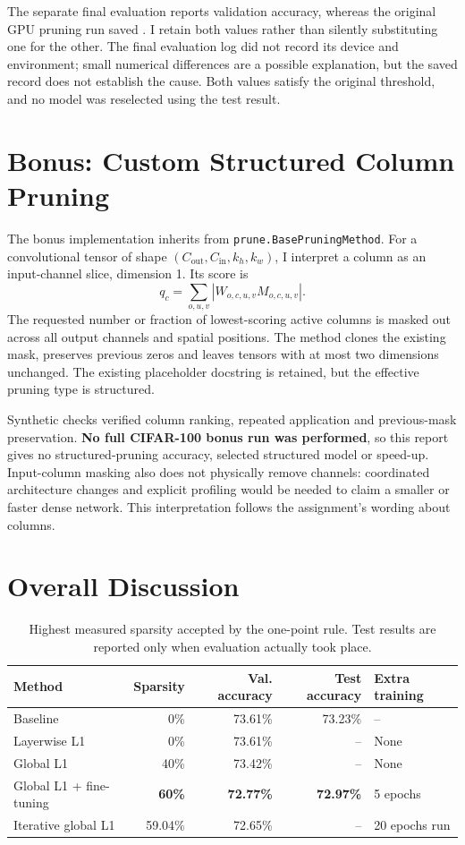 \documentclass[11pt,a4paper]{article}
\newcommand{\code}[1]{\texttt{#1}}
\begin{document}
The separate final evaluation reports \SelectedEvalVal{} validation accuracy, whereas the original GPU pruning run saved \SelectedVal. I retain both values rather than silently substituting one for the other. The final evaluation log did not record its device and environment; small numerical differences are a possible explanation, but the saved record does not establish the cause. Both values satisfy the original threshold, and no model was reselected using the test result.

\section{Bonus: Custom Structured Column Pruning}

The bonus implementation inherits from \code{prune.BasePruningMethod}. For a convolutional tensor of shape $(C_{\mathrm{out}},C_{\mathrm{in}},k_h,k_w)$, I interpret a column as an input-channel slice, dimension 1. Its score is
\begin{equation}
 q_c=\sum_{o,u,v}|W_{o,c,u,v}M_{o,c,u,v}|.
\end{equation}
The requested number or fraction of lowest-scoring active columns is masked out across all output channels and spatial positions. The method clones the existing mask, preserves previous zeros and leaves tensors with at most two dimensions unchanged. The existing placeholder docstring is retained, but the effective pruning type is structured.

Synthetic checks verified column ranking, repeated application and previous-mask preservation. \textbf{No full CIFAR-100 bonus run was performed}, so this report gives no structured-pruning accuracy, selected structured model or speed-up. Input-column masking also does not physically remove channels: coordinated architecture changes and explicit profiling would be needed to claim a smaller or faster dense network. This interpretation follows the assignment's wording about columns.

\section{Overall Discussion}

\begin{table}[htbp]
\centering
\small
\caption{Highest measured sparsity accepted by the one-point rule. Test results are reported only when evaluation actually took place.}
\label{tab:summary}
\begin{tabular}{lrrrl}
\toprule
Method & Sparsity & Val. accuracy & Test accuracy & Extra training \\
\midrule
Baseline & 0\% & 73.61\% & 73.23\% & -- \\
Layerwise L1 & 0\% & 73.61\% & -- & None \\
Global L1 & 40\% & 73.42\% & -- & None \\
Global L1 + fine-tuning & \textbf{60\%} & \textbf{72.77\%} & \textbf{72.97\%} & 5 epochs \\
Iterative global L1 & 59.04\% & 72.65\% & -- & 20 epochs run \\
\bottomrule
\end{tabular}
\end{table}
\end{document}
